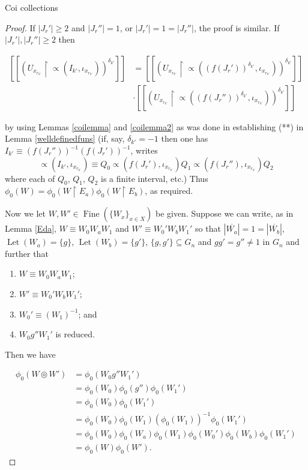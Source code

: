 \documentclass{amsart}
\theoremstyle{definition}\newtheorem{theorem}{Theorem}
\theoremstyle{definition}\newtheorem*{A}{Main Theorem}
\theoremstyle{definition}\newtheorem*{B}{Theorem \ref{elementaryequiv}}
\theoremstyle{definition}\newtheorem*{C}{Theorem \ref{continuous}}
\theoremstyle{definition}\newtheorem*{D}{Theorem \ref{bigisomorphism2}}
\theoremstyle{definition}\newtheorem{bigtheorem}{Main Theorem}
\numberwithin{theorem}{section}
\theoremstyle{definition}\newtheorem{corollary}[theorem]{Corollary}
\theoremstyle{definition}\newtheorem{proposition}[theorem]{Proposition}
\theoremstyle{definition}\newtheorem{definition}[theorem]{Definition}
\theoremstyle{definition}\newtheorem{question}[theorem]{Question}
\theoremstyle{definition}\newtheorem{example}[theorem]{Example}
\theoremstyle{definition}\newtheorem{remark}[theorem]{Remark}
\theoremstyle{definition}\newtheorem{note}[theorem]{Note}
\theoremstyle{definition}\newtheorem{lemma}[theorem]{Lemma}
\theoremstyle{definition}\newtheorem{fact}[theorem]{Fact}
\theoremstyle{definition}\newtheorem{define}[theorem]{Definition}
\theoremstyle{definition}\newtheorem{claim}[theorem]{Claim}
\theoremstyle{definition}\newtheorem{obs}[theorem]{Observation}
\theoremstyle{definition}\newtheorem{definitions}[theorem]{Definitions}
\newcommand{\Let}{\operatorname{Let}}
\newcommand{\Fine}{\operatorname{Fine}}
\begin{document}
\begin{section}{Coi collections}
\begin{proof}
\noindent If $|J_r'| \geq 2$ and $|J_r''| = 1$, or $|J_r'| = 1 = |J_r''|$, the proof is similar.  If $|J_r'|, |J_r''| \geq 2$ then

$$
\begin{array}{ll}
[[(U_{x_{r_{k'}}}\upharpoonright \varpropto(I_{k'}, \iota_{x_{r_{k'}}}))^{\delta_{k'}}]] & = [[(U_{x_{r_{k'}}}\upharpoonright \varpropto((f(J_r'))^{\delta_{k'}}, \iota_{x_{r_{k'}}}))^{\delta_{k'}}]]\\
& \cdot  [[(U_{x_{r_{k'}}}\upharpoonright \varpropto((f(J_r''))^{\delta_{k'}}, \iota_{x_{r_{k'}}}))^{\delta_{k'}}]]
\end{array}
$$

\noindent by using Lemmas \ref{coilemma} and \ref{coilemma2} as was done in establishing (**) in Lemma \ref{welldefinedfuns} (if, say, $\delta_{k'} = -1$ then one has $I_{k'} \equiv (f(J_r''))^{-1}(f(J_r'))^{-1}$, writes $$\varpropto(I_{k'}, \iota_{x_{r_{k'}}}) \equiv Q_0\varpropto(f(J_r'), \iota_{x_{r_{k'}}})Q_1\varpropto(f(J_r''), \iota_{x_{r_{k'}}})Q_2$$ where each of $Q_0$, $Q_1$, $Q_2$ is a finite interval, etc.)  Thus $\phi_0(W) = \phi_0(W \upharpoonright E_a)\phi_0(W \upharpoonright E_b)$, as required.

Now we let $W, W' \in \Fine(\{W_x\}_{x \in X})$ be given.  Suppose we can write, as in Lemma \ref{Eda}, $W \equiv W_0W_aW_1$ and $W' \equiv W_0'W_bW_1'$ so that $|\overline{W_a}| = 1 = |\overline{W_b}|$, $\Let(W_a)= \{g\}$,  $\Let(W_b) = \{g'\}$, $\{g, g'\} \subseteq G_n$ and $gg' = g'' \neq 1$ in $G_n$ and further that

\begin{enumerate}

\item $W \equiv W_0W_aW_1$;

\item $W' \equiv W_0'W_bW_1'$;

\item $W_0' \equiv (W_1)^{-1}$; and

\item $W_0g''W_1'$ is reduced.
\end{enumerate}

\noindent Then we have

$$
\begin{array}{ll}
\phi_0(W \circledcirc W') & = \phi_0(W_0g''W_1')\\
& = \phi_0(W_0)\phi_0(g'')\phi_0(W_1')\\
& = \phi_0(W_0)\phi_0(W_1')\\
& = \phi_0(W_0)\phi_0(W_1)(\phi_0(W_1))^{-1}\phi_0(W_1')\\
& = \phi_0(W_0)\phi_0(W_a)\phi_0(W_1)\phi_0(W_0')\phi_0(W_b)\phi_0(W_1')\\
& = \phi_0(W)\phi_0(W').
\end{array}
$$


\end{proof}
\end{section}
\end{document}
